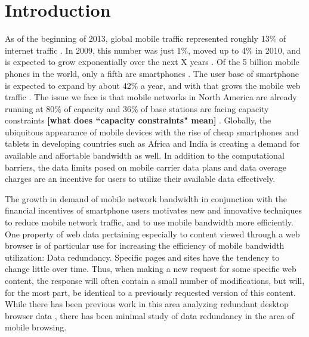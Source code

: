 \section{Introduction}
As of the beginning of 2013, global mobile traffic represented roughly 13\% of internet traffic \cite{?}. In 2009, this number was just 1\%, moved up 
to 4\% in 2010, and is expected to grow exponentially over the next X years \cite{?}. Of the 5 billion mobile phones in the world, only a fifth are 
smartphones \cite{?}. The user base of smartphone is expected to expand by about 42\% a year, and with that grows the mobile web traffic \cite{?}. The 
issue we face is that mobile networks in North America are already running at 80\% of capacity and 36\% of base stations are facing capacity constraints 
\textbf{[what does ``capacity constraints" mean]} \cite{?}. Globally, the ubiquitous appearance of mobile devices with the rise of cheap smartphones and 
tablets in developing countries such as Africa and India is creating a demand for available and affortable bandwidth as well. In addition to the computational 
barriers, the data limits posed on mobile carrier data plans and data overage charges are an incentive for users to utilize their available data effectively. 

The growth in demand of mobile network bandwidth in conjunction with the financial incentives of smartphone users motivates new and innovative techniques 
to reduce mobile network traffic, and to use mobile bandwidth more efficiently. One property of web data pertaining especially to content viewed through a 
web browser is of particular use for increasing the efficiency of mobile bandwidth utilization: Data redundancy. Specific pages and sites have the tendency 
to change little over time. Thus, when making a new request for some specific web content, the response will often contain a small number of modifications, 
but will, for the most part, be identical to a previously requested version of this content. While there has been previous work in this area analyzing redundant 
desktop browser data \cite{?}, there has been minimal study of data redundancy in the area of mobile browsing.


